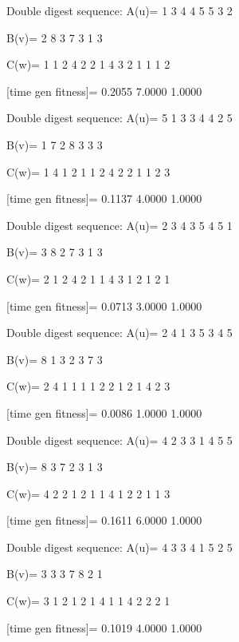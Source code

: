 Double digest sequence:
A(u)=
     1     3     4     4     5     5     3     2

B(v)=
     2     8     3     7     3     1     3

C(w)=
     1     1     2     4     2     2     1     4     3     2     1     1     1     2

[time gen fitness]=
    0.2055    7.0000    1.0000

Double digest sequence:
A(u)=
     5     1     3     3     4     4     2     5

B(v)=
     1     7     2     8     3     3     3

C(w)=
     1     4     1     2     1     1     2     4     2     2     1     1     2     3

[time gen fitness]=
    0.1137    4.0000    1.0000

Double digest sequence:
A(u)=
     2     3     4     3     5     4     5     1

B(v)=
     3     8     2     7     3     1     3

C(w)=
     2     1     2     4     2     1     1     4     3     1     2     1     2     1

[time gen fitness]=
    0.0713    3.0000    1.0000

Double digest sequence:
A(u)=
     2     4     1     3     5     3     4     5

B(v)=
     8     1     3     2     3     7     3

C(w)=
     2     4     1     1     1     1     2     2     1     2     1     4     2     3

[time gen fitness]=
    0.0086    1.0000    1.0000

Double digest sequence:
A(u)=
     4     2     3     3     1     4     5     5

B(v)=
     8     3     7     2     3     1     3

C(w)=
     4     2     2     1     2     1     1     4     1     2     2     1     1     3

[time gen fitness]=
    0.1611    6.0000    1.0000

Double digest sequence:
A(u)=
     4     3     3     4     1     5     2     5

B(v)=
     3     3     3     7     8     2     1

C(w)=
     3     1     2     1     2     1     4     1     1     4     2     2     2     1

[time gen fitness]=
    0.1019    4.0000    1.0000

